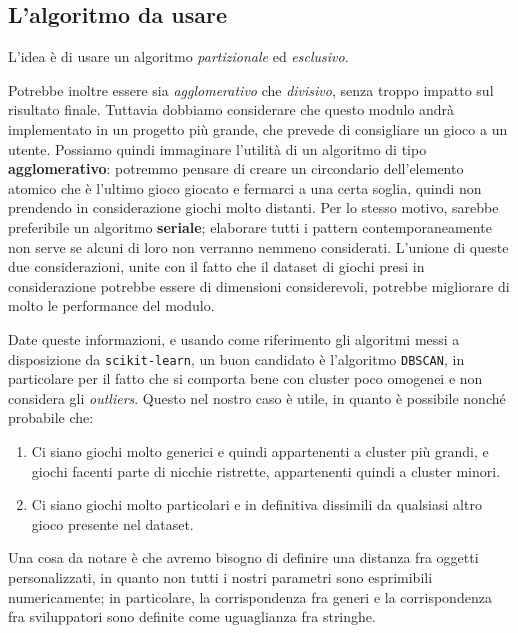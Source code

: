     \subsection{L'algoritmo da usare}
        L'idea è di usare un algoritmo \textit{partizionale} ed \textit{esclusivo}.
        
        Potrebbe inoltre essere sia \textit{agglomerativo} che \textit{divisivo}, senza troppo impatto sul risultato finale. Tuttavia dobbiamo considerare che questo modulo andrà implementato in un progetto più grande, che prevede di consigliare un gioco a un utente. Possiamo quindi immaginare l'utilità di un algoritmo di tipo \textbf{agglomerativo}: potremmo pensare di creare un circondario dell'elemento atomico che è l'ultimo gioco giocato e fermarci a una certa soglia, quindi non prendendo in considerazione giochi molto distanti. Per lo stesso motivo, sarebbe preferibile un algoritmo \textbf{seriale}; elaborare tutti i pattern contemporaneamente non serve se alcuni di loro non verranno nemmeno considerati. L'unione di queste due considerazioni, unite con il fatto che il dataset di giochi presi in considerazione potrebbe essere di dimensioni considerevoli, potrebbe migliorare di molto le performance del modulo.
        
        Date queste informazioni, e usando come riferimento gli algoritmi messi a disposizione da \texttt{scikit-learn}, un buon candidato è l'algoritmo \texttt{DBSCAN}, in particolare per il fatto che si comporta bene con cluster poco omogenei e non considera gli \textit{outliers}. Questo nel nostro caso è utile, in quanto è possibile nonché probabile che:
        \begin{enumerate}
            \item Ci siano giochi molto generici e quindi appartenenti a cluster più grandi, e giochi facenti parte di nicchie ristrette, appartenenti quindi a cluster minori.
            
            \item Ci siano giochi molto particolari e in definitiva dissimili da qualsiasi altro gioco presente nel dataset.
        \end{enumerate}
        
        Una cosa da notare è che avremo bisogno di definire una distanza fra oggetti personalizzati, in quanto non tutti i nostri parametri sono esprimibili numericamente; in particolare, la corrispondenza fra generi e la corrispondenza fra sviluppatori sono definite come uguaglianza fra stringhe.
        

